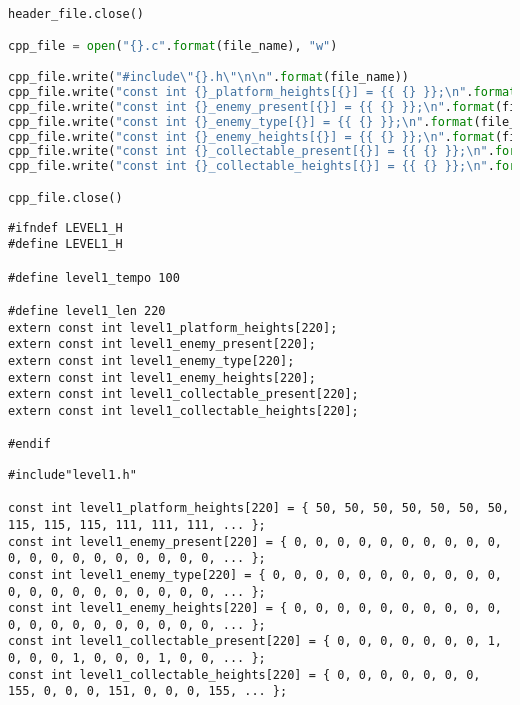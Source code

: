 \begin{lstlisting}[language=python,label={lst:levelparser},caption={\textit{script python} para realizar o \textit{parse}}]
header_file.close()

cpp_file = open("{}.c".format(file_name), "w")

cpp_file.write("#include\"{}.h\"\n\n".format(file_name))
cpp_file.write("const int {}_platform_heights[{}] = {{ {} }};\n".format(file_name, str(len(heights)), ', '.join(heights)))
cpp_file.write("const int {}_enemy_present[{}] = {{ {} }};\n".format(file_name, str(len(ep)), ', '.join(ep)))
cpp_file.write("const int {}_enemy_type[{}] = {{ {} }};\n".format(file_name, str(len(et)), ', '.join(et)))
cpp_file.write("const int {}_enemy_heights[{}] = {{ {} }};\n".format(file_name, str(len(eh)), ', '.join(eh)))
cpp_file.write("const int {}_collectable_present[{}] = {{ {} }};\n".format(file_name, str(len(cp)), ', '.join(cp)))
cpp_file.write("const int {}_collectable_heights[{}] = {{ {} }};\n".format(file_name, str(len(ch)), ', '.join(ch)))

cpp_file.close()
\end{lstlisting}

\begin{lstlisting}[label={lst:parsedheader},caption={Código-fonte gerado pelo \textit{level design parser}}]
#ifndef LEVEL1_H
#define LEVEL1_H

#define level1_tempo 100

#define level1_len 220
extern const int level1_platform_heights[220];
extern const int level1_enemy_present[220];
extern const int level1_enemy_type[220];
extern const int level1_enemy_heights[220];
extern const int level1_collectable_present[220];
extern const int level1_collectable_heights[220];

#endif
\end{lstlisting}

\begin{lstlisting}[label={lst:parsedcpp},caption={Amostra do \textit{header} gerado pelo \textit{level design parser}}]
#include"level1.h"

const int level1_platform_heights[220] = { 50, 50, 50, 50, 50, 50, 50, 115, 115, 115, 111, 111, 111, ... };
const int level1_enemy_present[220] = { 0, 0, 0, 0, 0, 0, 0, 0, 0, 0, 0, 0, 0, 0, 0, 0, 0, 0, 0, 0, ... };
const int level1_enemy_type[220] = { 0, 0, 0, 0, 0, 0, 0, 0, 0, 0, 0, 0, 0, 0, 0, 0, 0, 0, 0, 0, 0, ... };
const int level1_enemy_heights[220] = { 0, 0, 0, 0, 0, 0, 0, 0, 0, 0, 0, 0, 0, 0, 0, 0, 0, 0, 0, 0, ... };
const int level1_collectable_present[220] = { 0, 0, 0, 0, 0, 0, 0, 1, 0, 0, 0, 1, 0, 0, 0, 1, 0, 0, ... };
const int level1_collectable_heights[220] = { 0, 0, 0, 0, 0, 0, 0, 155, 0, 0, 0, 151, 0, 0, 0, 155, ... };
\end{lstlisting}

